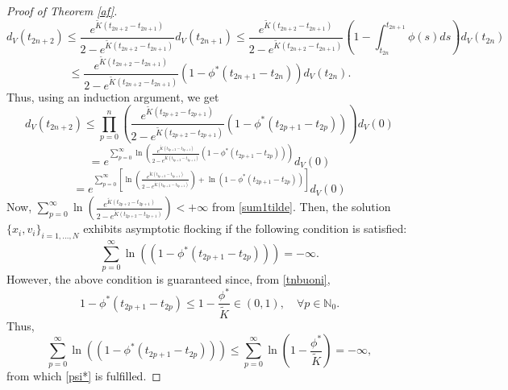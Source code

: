 \documentclass[10pt,a4paper]{amsart}
\begin{document}
\begin{proof}[Proof of Theorem \ref{af}]
	$$d_V(t_{2n+2})\leq \frac{e^{\tilde K(t_{2n+2}-t_{2n+1})}}{2-e^{\tilde K(t_{2n+2}-t_{2n+1})}}d_V(t_{2n+1})\leq \frac{e^{\tilde K(t_{2n+2}-t_{2n+1})}}{2-e^{\tilde K(t_{2n+2}-t_{2n+1})}}\left(1-\int_{t_{2n}}^{t_{2n+1}}\phi(s)ds\right)d_V(t_{2n})$$
	$$\leq \frac{e^{\tilde K(t_{2n+2}-t_{2n+1})}}{2-e^{\tilde K(t_{2n+2}-t_{2n+1})}}\left(1-\phi^*(t_{2n+1}-t_{2n})\right)d_V(t_{2n}).$$
	Thus, using an induction argument, we get
	$$d_V(t_{2n+2})\leq \prod_{p=0}^{n}\left(\frac{e^{\tilde K(t_{2p+2}-t_{2p+1})}}{2-e^{\tilde K(t_{2p+2}-t_{2p+1})}}\left(1-\phi^*(t_{2p+1}-t_{2p})\right)\right)d_V(0)$$
	$$=e^{\sum_{p=0}^{\infty}\ln \left(\frac{e^{\tilde K(t_{2p+2}-t_{2p+1})}}{2-e^{\tilde K(t_{2p+2}-t_{2p+1})}}\left(1-\phi^*(t_{2p+1}-t_{2p})\right)\right)}d_V(0)$$
	$$=e^{\sum_{p=0}^{\infty}\left[\ln \left(\frac{e^{\tilde K(t_{2p+2}-t_{2p+1})}}{2-e^{\tilde K(t_{2p+2}-t_{2p+1})}}\right)+\ln\left(1-\phi^*(t_{2p+1}-t_{2p})\right)\right]}d_V(0)$$
	Now, $\sum_{p=0}^{\infty}\ln \left(\frac{e^{\tilde K(t_{2p+2}-t_{2p+1})}}{2-e^{\tilde K(t_{2p+2}-t_{2p+1})}}\right)<+\infty$ from \eqref{sum1tilde}. Then, the solution $\{x_{i},v_{i}\}_{i=1,\dots,N}$ exhibits asymptotic flocking if the following condition is satisfied:
	\begin{equation}\label{psi*}
		\sum_{p=0}^{\infty}\ln\left(\left(1-\phi^*(t_{2p+1}-t_{2p})\right)\right)=-\infty.
	\end{equation}
	However, the above condition is guaranteed since, from \eqref{tnbuoni},
	$$1-\phi^*(t_{2p+1}-t_{2p})\leq 1-\frac{\phi^*}{\tilde K}\in (0,1),\quad \forall p\in \mathbb{N}_0.$$
	Thus, $$\sum_{p=0}^{\infty}\ln\left(\left(1-\phi^*(t_{2p+1}-t_{2p})\right)\right)\leq \sum_{p=0}^{\infty}\ln\left(1-\frac{\phi^*}{\tilde K}\right)=-\infty,$$
	from which \eqref{psi*} is fulfilled.
\end{proof}
\end{document}
